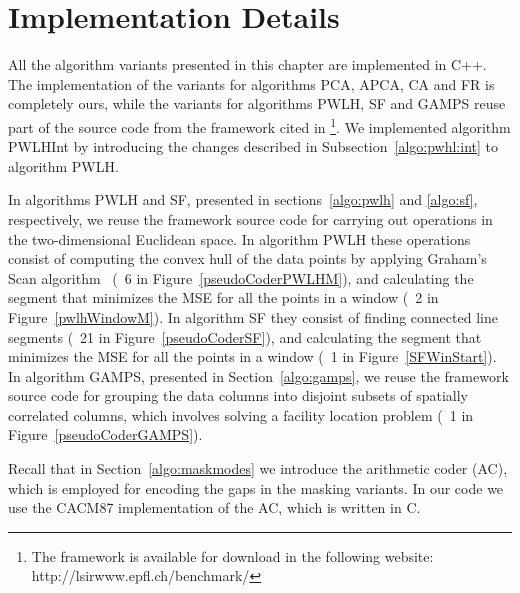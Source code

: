 


\vspace{+10pt}
\section{Implementation Details}
\label{algo:adddetails}


All the algorithm variants presented in this chapter are implemented in C++. The implementation of the variants for algorithms PCA, APCA, CA and FR is completely ours, while the variants for algorithms PWLH, SF and GAMPS reuse part of the source code from the framework cited in \cite{AnEva2013}\footnote{The framework is available for download in the following website: http://lsirwww.epfl.ch/benchmark/}. We implemented algorithm PWLHInt by introducing the changes described in Subsection~\ref{algo:pwhl:int} to algorithm PWLH. 


In algorithms PWLH and SF, presented in sections~\ref{algo:pwlh} and \ref{algo:sf}, respectively, we reuse the framework source code for carrying out operations in the two-dimensional Euclidean space. In algorithm PWLH these operations consist of computing the convex hull of the data points by applying Graham's Scan algorithm~\cite{GrahamAlgo} (\Line~6 in Figure~\ref{pseudoCoderPWLHM}), and calculating the segment that minimizes the MSE for all the points in a window (\Line~2 in Figure~\ref{pwlhWindowM}). In algorithm SF they consist of finding connected line segments (\Line~21 in Figure~\ref{pseudoCoderSF}), and calculating the segment that minimizes the MSE for all the points in a window (\Line~1 in Figure~\ref{SFWinStart}). In algorithm GAMPS, presented in Section~\ref{algo:gamps},  we reuse the framework source code for grouping the data columns into disjoint subsets of spatially correlated columns, which involves solving a facility location problem (\Line~1 in Figure~\ref{pseudoCoderGAMPS}).


Recall that in Section~\ref{algo:maskmodes} we introduce the arithmetic coder (AC), which is employed for encoding the gaps in the masking variants. In our code we use the CACM87 implementation \cite{arcodingcomp, ac1} of the AC, which is written in C.

